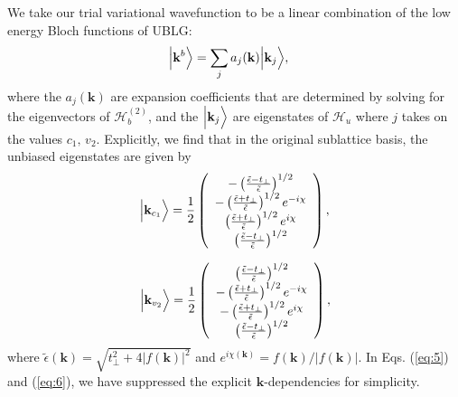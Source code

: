 \documentclass[twocolumn,secnumarabic,amssymb, nobibnotes, aps, prd, superscriptaddress]{revtex4-1}
\begin{document}
We take our trial variational wavefunction to be a linear combination of the low energy Bloch functions of UBLG:
\begin{equation}
\begin{aligned}\Bigl|\mathbf{k}^{b}\Bigr\rangle & =\sum_{j}a_{j}(\mathbf{k})\Bigl|\mathbf{k}_{j}\Bigr\rangle,\end{aligned}\label{eq:bloch}
\end{equation}
where the $a_{j}(\mathbf{k})$ are expansion coefficients that are determined by solving for the eigenvectors of $\mathcal{H}_{b}^{(2)}$, and the $\Bigl|\mathbf{k}_{j}\Bigr\rangle$ are eigenstates of $\mathcal{H}_{u}$ where $j$ takes on the values $c_{1},\,v_{2}$. Explicitly, we find that in the original sublattice basis, the unbiased eigenstates are given by \cite{mcgouran2016nonlinear}
\begin{equation}
\Bigl|\mathbf{k}_{c_{1}}\Bigr\rangle=\frac{1}{2}\left(\begin{array}{c}
-\left(\frac{\tilde{\epsilon}-t_{\perp}}{\tilde{\epsilon}}\right)^{1/2}\\
-\left(\frac{\tilde{\epsilon}+t_{\perp}}{\tilde{\epsilon}}\right)^{1/2}e^{-i\chi}\\
\left(\frac{\tilde{\epsilon}+t_{\perp}}{\tilde{\epsilon}}\right)^{1/2}e^{i\chi}\\
\left(\frac{\tilde{\epsilon}-t_{\perp}}{\tilde{\epsilon}}\right)^{1/2}
\end{array}\right),\label{eq:5}
\end{equation} 

\begin{equation}
\Bigl|\mathbf{k}_{v_{2}}\Bigr\rangle=\frac{1}{2}\left(\begin{array}{c}
\left(\frac{\tilde{\epsilon}-t_{\perp}}{\tilde{\epsilon}}\right)^{1/2}\\
-\left(\frac{\tilde{\epsilon}+t_{\perp}}{\tilde{\epsilon}}\right)^{1/2}e^{-i\chi}\\
-\left(\frac{\tilde{\epsilon}+t_{\perp}}{\tilde{\epsilon}}\right)^{1/2}e^{i\chi}\\
\left(\frac{\tilde{\epsilon}-t_{\perp}}{\tilde{\epsilon}}\right)^{1/2}
\end{array}\right),\label{eq:6}
\end{equation}
where $\tilde{\epsilon}(\mathbf{k})=\sqrt{t_{\perp}^{2}+4|f\left(\mathbf{k}\right)|^{2}}$ and $ e^{i\chi\left(\mathbf{k}\right)}=f\left(\mathbf{k}\right)/\left\vert f\left(\mathbf{k}\right)\right\vert$. In Eqs. (\ref{eq:5}) and (\ref{eq:6}), we have suppressed the explicit $\mathbf{k}$-dependencies for simplicity. 
\end{document}
